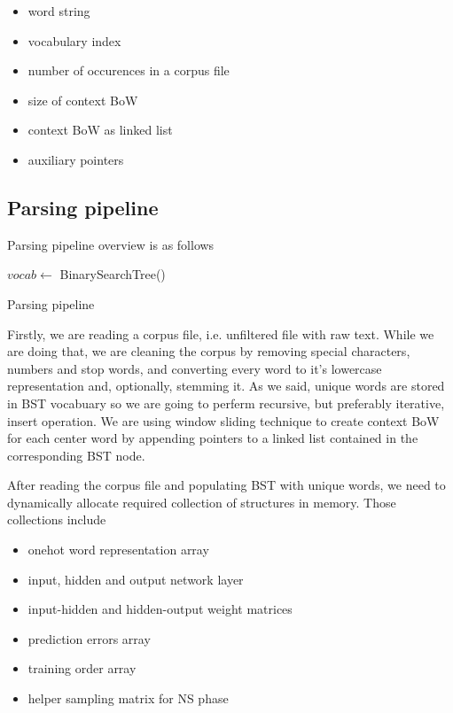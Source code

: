 \documentclass{article}
\newcommand{\SetAlgoStyle}{
	\SetAlgoNoLine
	\SetAlgoNoEnd
	\DontPrintSemicolon
}
\begin{document}
\begin{itemize}
	\item word string
	\item vocabulary index
	\item number of occurences in a corpus file
	\item size of context BoW
	\item context BoW as linked list
	\item auxiliary pointers
\end{itemize}

\subsection{Parsing pipeline}

Parsing pipeline overview is as follows

\begin{algorithm}[H]
	\SetAlgoStyle
	$vocab \gets$ BinarySearchTree()\;
	\caption{Parsing pipeline}
\end{algorithm}

Firstly, we are reading a corpus file, i.e. unfiltered file with raw
text. While we are doing that, we are cleaning the corpus by removing special
characters, numbers and stop words, and converting every word to it's
lowercase representation and, optionally, stemming it. As we said, unique words are stored in BST
vocabuary so we are going to perferm recursive, but preferably iterative,
insert operation. We are using window sliding technique to create context BoW 
for each center word by appending pointers to a linked list contained in the
corresponding BST node.

\medbreak

After reading the corpus file and populating BST with unique words, we need to
dynamically allocate required collection of structures in memory. Those
collections include

\begin{itemize}
	\item onehot word representation array
	\item input, hidden and output network layer
	\item input-hidden and hidden-output weight matrices
	\item prediction errors array
	\item training order array
	\item helper sampling matrix for NS phase
\end{itemize}
\end{document}
